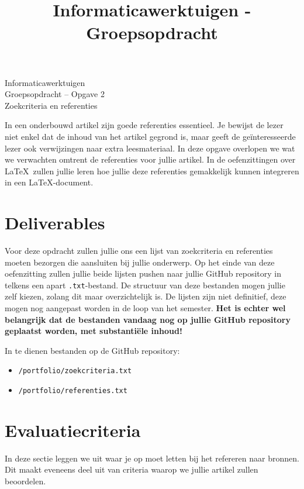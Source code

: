 \documentclass[a4paper]{article}
\title{Informaticawerktuigen - Groepsopdracht}
\begin{document}
\begin{center}
  \huge Informaticawerktuigen \\
  \Huge Groepsopdracht -- Opgave 2 \\
  \huge Zoekcriteria en referenties \\
\end{center}
\vspace{1em}


In een onderbouwd artikel zijn goede referenties essentieel.
Je bewijst de lezer niet enkel dat de inhoud van het artikel gegrond is, maar geeft de ge\"interesseerde lezer ook verwijzingen naar extra leesmateriaal.
In deze opgave overlopen we wat we verwachten omtrent de referenties voor jullie artikel.
In de oefenzittingen over \LaTeX~zullen jullie leren hoe jullie deze referenties gemakkelijk kunnen integreren in een \LaTeX-document.


\section{Deliverables}

Voor deze opdracht zullen jullie ons een lijst van zoekcriteria en referenties moeten bezorgen die aansluiten bij jullie onderwerp.
Op het einde van deze oefenzitting zullen jullie beide lijsten pushen naar jullie GitHub repository in telkens een apart \texttt{.txt}-bestand.
De structuur van deze bestanden mogen jullie zelf kiezen, zolang dit maar overzichtelijk is.
De lijsten zijn niet definitief, deze mogen nog aangepast worden in de loop van het semester.
\textbf{Het is echter wel belangrijk dat de bestanden vandaag nog op jullie GitHub repository geplaatst worden, met substanti\"ele inhoud!}

In te dienen bestanden op de GitHub repository:

\begin{itemize}
	\item \texttt{/portfolio/zoekcriteria.txt}
	\item \texttt{/portfolio/referenties.txt}
\end{itemize}


\section{Evaluatiecriteria}

In deze sectie leggen we uit waar je op moet letten bij het refereren naar bronnen.
Dit maakt eveneens deel uit van criteria waarop we jullie artikel zullen beoordelen.
\end{document}
